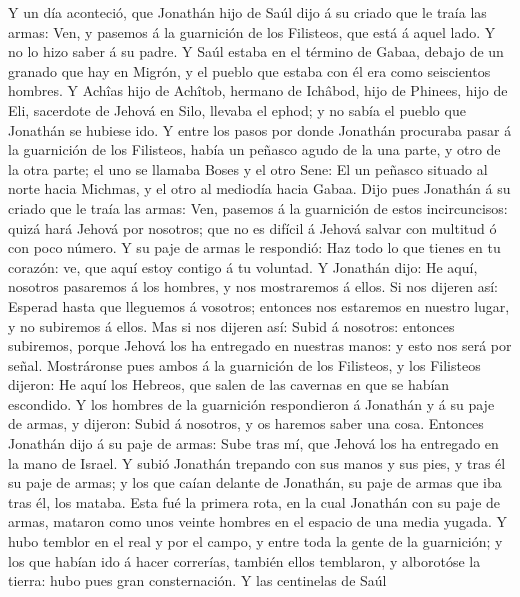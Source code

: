  Y un día aconteció, que Jonathán hijo de Saúl dijo á su
criado que le traía las armas: Ven, y pasemos á la guarnición de los
Filisteos, que está á aquel lado. Y no lo hizo saber á su padre.
 Y Saúl estaba en el término de Gabaa, debajo de un
granado que hay en Migrón, y el pueblo que estaba con él era como
seiscientos hombres.  Y Achîas hijo de Achîtob, hermano de
Ichâbod, hijo de Phinees, hijo de Eli, sacerdote de Jehová en Silo,
llevaba el ephod; y no sabía el pueblo que Jonathán se hubiese ido.
 Y entre los pasos por donde Jonathán procuraba pasar á la
guarnición de los Filisteos, había un peñasco agudo de la una parte, y
otro de la otra parte; el uno se llamaba Boses y el otro Sene:
 El un peñasco situado al norte hacia Michmas, y el otro
al mediodía hacia Gabaa.  Dijo pues Jonathán á su criado
que le traía las armas: Ven, pasemos á la guarnición de estos
incircuncisos: quizá hará Jehová por nosotros; que no es difícil á
Jehová salvar con multitud ó con poco número.  Y su paje
de armas le respondió: Haz todo lo que tienes en tu corazón: ve, que
aquí estoy contigo á tu voluntad.  Y Jonathán dijo: He
aquí, nosotros pasaremos á los hombres, y nos mostraremos á ellos.
 Si nos dijeren así: Esperad hasta que lleguemos á
vosotros; entonces nos estaremos en nuestro lugar, y no subiremos á
ellos.  Mas si nos dijeren así: Subid á nosotros:
entonces subiremos, porque Jehová los ha entregado en nuestras manos: y
esto nos será por señal.  Mostráronse pues ambos á la
guarnición de los Filisteos, y los Filisteos dijeron: He aquí los
Hebreos, que salen de las cavernas en que se habían escondido.
 Y los hombres de la guarnición respondieron á Jonathán y
á su paje de armas, y dijeron: Subid á nosotros, y os haremos saber una
cosa. Entonces Jonathán dijo á su paje de armas: Sube tras mí, que
Jehová los ha entregado en la mano de Israel.  Y subió
Jonathán trepando con sus manos y sus pies, y tras él su paje de armas;
y los que caían delante de Jonathán, su paje de armas que iba tras él,
los mataba.  Esta fué la primera rota, en la cual
Jonathán con su paje de armas, mataron como unos veinte hombres en el
espacio de una media yugada.  Y hubo temblor en el real y
por el campo, y entre toda la gente de la guarnición; y los que habían
ido á hacer correrías, también ellos temblaron, y alborotóse la tierra:
hubo pues gran consternación.  Y las centinelas de Saúl
